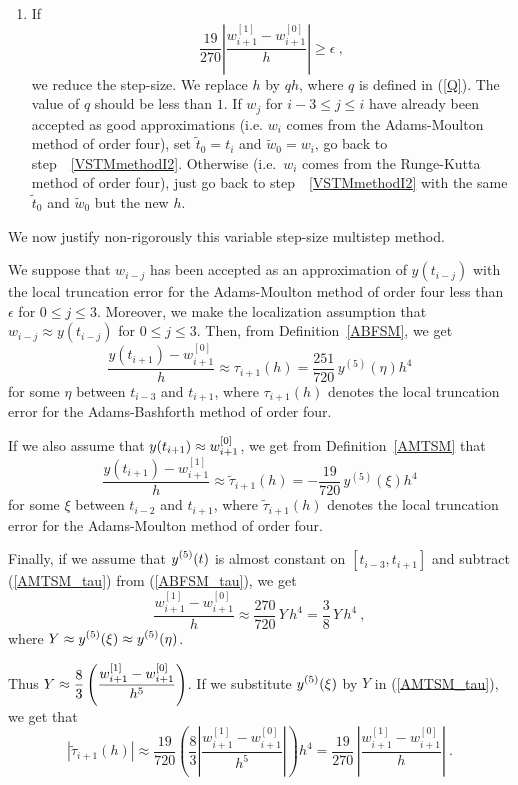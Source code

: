 \begin{algo}
\begin{enumerate}
\item If
\[
\frac{19}{270} \left| \frac{w_{i+1}^{[1]} - w_{i+1}^{[0]}}{h} \right|
\geq \epsilon \ ,
\]
we reduce the step-size.  We replace $h$ by $qh$, where $q$ is defined
in (\ref{Q}).  The value of $q$ should be less than $1$.  If $w_j$ for
$i-3 \leq j \leq i$ have already been accepted as good approximations
(i.e. $w_i$ comes from the Adams-Moulton method of order four),
set $\tilde{t}_0 = t_i$ and $\tilde{w}_0= w_i$, go back to
step~~\ref{VSTMmethodI2}.  Otherwise
(i.e.\ $w_i$ comes from the Runge-Kutta method of order four), just
go back to step~~\ref{VSTMmethodI2} with the same
$\tilde{t}_0$ and $\tilde{w}_0$ but the new $h$.
\end{enumerate}
\end{algo}

We now justify non-rigorously this variable step-size multistep
method.

We suppose that $w_{i-j}$ has been accepted as an approximation of
$y(t_{i-j})$ with the local truncation error for the
Adams-Moulton method of order four less than $\epsilon$ for
$0 \leq j \leq 3$.  Moreover, we make the localization assumption that
$w_{i-j} \approx y(t_{i-j})$ for $0 \leq j \leq 3$.  Then, from
Definition~\ref{ABFSM}, we get
\begin{equation} \label{ABFSM_tau}
\frac{y(t_{i+1}) - w_{i+1}^{[0]}}{h}
\approx \tau_{i+1}(h) = \frac{251}{720}\, y^{(5)}(\eta) h^4
\end{equation}
for some $\eta$ between $t_{i-3}$ and $t_{i+1}$, where $\tau_{i+1}(h)$
denotes the local truncation error for the Adams-Bashforth method of
order four.

If we also assume that
$\displaystyle y(t_{i+1}) \approx w_{i+1}^{[0]}$, we get
from Definition~\ref{AMTSM} that
\begin{equation} \label{AMTSM_tau}
\frac{y(t_{i+1}) -w_{i+1}^{[1]}}{h} \approx
\tilde{\tau}_{i+1}(h) = -\frac{19}{720}\, y^{(5)}(\xi) h^4
\end{equation}
for some $\xi$ between $t_{i-2}$ and $t_{i+1}$, where
$\tilde{\tau}_{i+1}(h)$ denotes the local truncation error for the
Adams-Moulton method of order four.

Finally, if we assume that $\displaystyle y^{(5)}(t)$ is almost constant on
$[t_{i-3},t_{i+1}]$ and subtract (\ref{AMTSM_tau}) from
(\ref{ABFSM_tau}), we get
\[
\frac{w_{i+1}^{[1]} - w_{i+1}^{[0]}}{h} \approx
\frac{270}{720}\,Y \,h^4 = \frac{3}{8}\, Y \,h^4 \ ,
\]
where $\displaystyle Y \approx y^{(5)}(\xi) \approx y^{(5)}(\eta)$.

Thus $\displaystyle Y \approx
\frac{8}{3}\left(\frac{w_{i+1}^{[1]} - w_{i+1}^{[0]}}{h^5}\right)$.
If we substitute $\displaystyle y^{(5)}(\xi)$ by $Y$ in
(\ref{AMTSM_tau}), we get that
\[
\left| \tilde{\tau}_{i+1}(h) \right| \approx
\frac{19}{720}\left(\frac{8}{3}
\left| \frac{w_{i+1}^{[1]} - w_{i+1}^{[0]}}{h^5} \right| \right) h^4 =
\frac{19}{270}\,\left|\frac{w_{i+1}^{[1]} - w_{i+1}^{[0]}}{h}\right| \ .
\]

